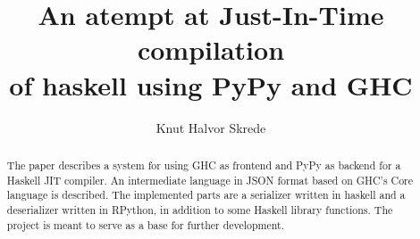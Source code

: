 \documentclass{article}
\begin{document}
\title{An atempt at Just-In-Time compilation\\of haskell using PyPy and GHC}
\author{Knut Halvor Skrede}
\maketitle

\begin{abstract}
The paper describes a system for using GHC as frontend and PyPy as backend for a 
Haskell JIT compiler. An intermediate language in JSON format based on GHC's Core
language is described. The implemented parts are a serializer written in haskell and
a deserializer written in RPython, in addition to some Haskell library functions.
The project is meant to serve as a base for further development. 
\end{abstract}

\clearpage

\tableofcontents

\clearpage

\setlength\LTleft{0pt}
\setlength\LTright{0pt}






















\end{document}
